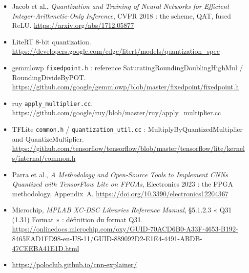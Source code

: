 \documentclass[11pt,a4paper]{article}
\begin{document}
\begin{itemize}
  \item Jacob et al., \emph{Quantization and Training of Neural Networks for
    Efficient Integer-Arithmetic-Only Inference}, CVPR 2018 : the scheme,
    QAT, fused ReLU. \url{https://arxiv.org/abs/1712.05877}
  \item LiteRT 8-bit quantization.
    \url{https://developers.google.com/edge/litert/models/quantization_spec}
  \item gemmlowp \texttt{fixedpoint.h} : reference
    SaturatingRoundingDoublingHighMul / RoundingDivideByPOT.
    \url{https://github.com/google/gemmlowp/blob/master/fixedpoint/fixedpoint.h}
  \item ruy \texttt{apply\_multiplier.cc}.
    \url{https://github.com/google/ruy/blob/master/ruy/apply_multiplier.cc}
  \item TFLite \texttt{common.h} / \texttt{quantization\_util.cc} :
    MultiplyByQuantizedMultiplier and QuantizeMultiplier.
    \url{https://github.com/tensorflow/tensorflow/blob/master/tensorflow/lite/kernels/internal/common.h}
  \item Parra et al., \emph{A Methodology and Open-Source Tools to Implement
    CNNs Quantized with TensorFlow Lite on FPGAs}, Electronics 2023 : the
    FPGA methodology, Appendix~A. \url{https://doi.org/10.3390/electronics12204367}
  \item Microchip, \emph{MPLAB XC-DSC Libraries Reference Manual},
    \S5.1.2.3 « Q31 (1.31) Format » : définition du format Q31.
    \url{https://onlinedocs.microchip.com/oxy/GUID-70ACD6B0-A33F-4653-B192-8465EAD1FD98-en-US-11/GUID-889092D2-E1E4-4491-ABDB-47CEEBA41E1D.html}
  \item \url{https://poloclub.github.io/cnn-explainer/}
\end{itemize}
\end{document}
